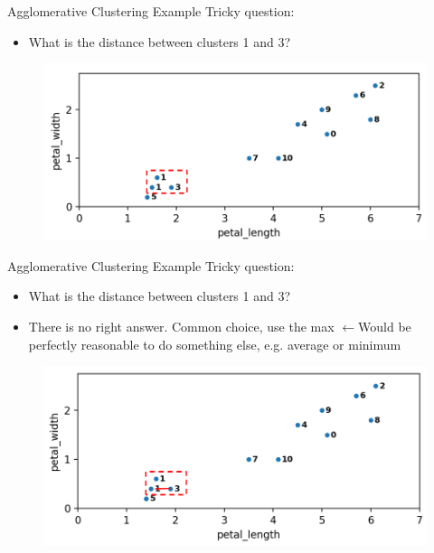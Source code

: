 \documentclass[aspectratio=169]{../latex_main/tntbeamer}  %
\begin{document}
	
	\begin{frame}{Agglomerative Clustering Example}
	    Tricky question:
	    \begin{itemize}
	        \item What is the distance between clusters 1 and 3?
	    \end{itemize}
	    \begin{figure}
	        \centering
	        \includegraphics[scale=.35]{Bild31}
	    \end{figure}
	\end{frame}
	
	
	\begin{frame}{Agglomerative Clustering Example}
	    Tricky question:
	    \begin{itemize}
	        \item What is the distance between clusters 1 and 3?
	        \item There is no right answer. Common choice, use the max $\leftarrow$Would be perfectly reasonable to do something else, e.g. average or minimum

	    \end{itemize}
	    \begin{figure}
	        \centering
	        \includegraphics[scale=.35]{Bild32}
	    \end{figure}
	\end{frame}
	
\end{document}
